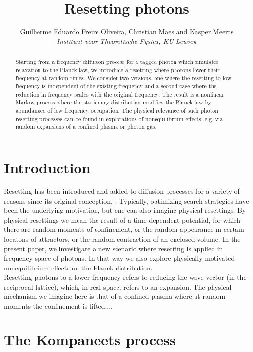 \documentclass[a4paper,12pt,reqno,superscriptaddress,nofootinbib]{article}
\theoremstyle{plain}
\theoremstyle{definition}
\theoremstyle{remark}
\newcommand{\0}{^{(0)}}
\newcommand{\1}{^{(1)}}
\newcommand{\2}{^{(2)}}
\begin{document}
	\title{Resetting photons}	
	\author{Guilherme Eduardo Freire Oliveira, Christian Maes and Kasper Meerts\\ {\it Instituut voor Theoretische Fysica, KU Leuven}}

\begin{abstract}
Starting from a frequency diffusion process for a tagged photon which simulates relaxation to the Planck law,  we introduce a resetting where photons lower their frequency at random times.
We consider two versions, one where the resetting to low frequency is independent of the existing frequency and a second case where the reduction in frequency scales with the original frequency.  The result is a nonlinear Markov process where the stationary distribution modifies the Planck law by abundanace of low frequency occupation. The physical relevance of such photon resetting processes can be found in explorations of nonequilibrium effects, e.g. via random expansions of a confined plasma or photon gas. 
\end{abstract}
\maketitle

\tableofcontents
\section{Introduction}
Resetting has been introduced and added to diffusion processes for a variety of reasons since its original conception, \cite{evans}.  Typically, optimizing search strategies have been the underlying motivation, but one can also imagine physical resettings.  By physical resettings we mean the result of a time-dependent potential, for which there are random moments of confinement, or the random appearance in certain locatons of attractors, or the random contraction of an enclosed volume.  In the present paper, we investigate a new scenario where resetting is applied in frequency space of photons.  In that way we also explore physically motivated nonequilibrium effects on the Planck distribution.\\

Resetting photons to a lower frequency refers to reducing the wave vector (in the reciprocal lattice), which, in real space, refers to an expansion.  The physical mechanism we imagine here is that of a confined plasma where at random moments the confinement is lifted....

\section{The Kompaneets process}
\end{document}
